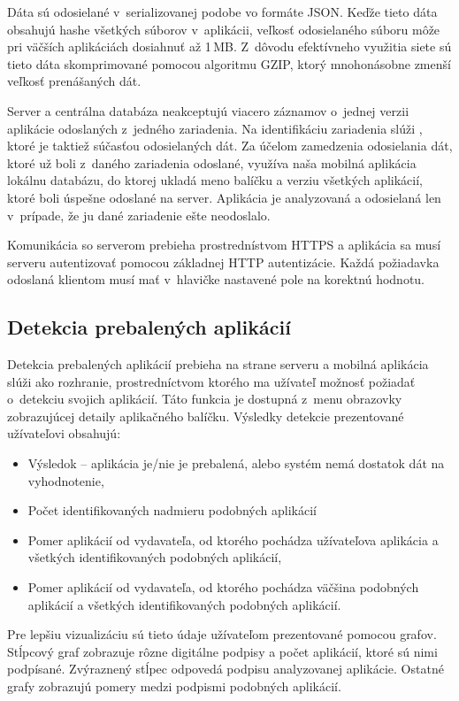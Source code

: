 Dáta sú odosielané v~serializovanej podobe vo formáte JSON. Keďže tieto dáta obsahujú hashe všetkých súborov v~aplikácii, veľkosť odosielaného súboru môže pri väčších aplikáciách dosiahnuť až 1\,MB. Z~dôvodu efektívneho využitia siete sú tieto dáta skomprimované pomocou algoritmu GZIP, ktorý mnohonásobne zmenší veľkosť prenášaných dát.

Server a centrálna databáza neakceptujú viacero záznamov o~jednej verzii aplikácie odoslaných z~jedného zariadenia. Na identifikáciu zariadenia slúži , ktoré je taktiež súčasťou odosielaných dát. Za účelom zamedzenia odosielania dát, ktoré už boli z~daného zariadenia odoslané, využíva naša mobilná aplikácia lokálnu databázu, do ktorej ukladá meno balíčku a verziu všetkých aplikácií, ktoré boli úspešne odoslané na server. Aplikácia je analyzovaná a odosielaná len v~prípade, že ju dané zariadenie ešte neodoslalo.

Komunikácia so serverom prebieha prostrednístvom HTTPS a aplikácia sa musí serveru autentizovať pomocou základnej HTTP autentizácie. Každá požiadavka odoslaná klientom musí mať v~hlavičke nastavené pole  na korektnú hodnotu.

\subsection{Detekcia prebalených aplikácií}
Detekcia prebalených aplikácií prebieha na strane serveru a mobilná aplikácia slúži ako rozhranie, prostredníctvom ktorého ma užívateľ možnosť požiadať o~detekciu svojich aplikácií. Táto funkcia je dostupná z~menu obrazovky zobrazujúcej detaily aplikačného balíčku. Výsledky detekcie prezentované užívateľovi obsahujú:
\begin{itemize}
	\item Výsledok -- aplikácia je/nie je prebalená, alebo systém nemá dostatok dát na vyhodnotenie,
	\item Počet identifikovaných nadmieru podobných aplikácií
	\item Pomer aplikácií od vydavateľa, od ktorého pochádza užívateľova aplikácia a všetkých identifikovaných podobných aplikácií,
	\item Pomer aplikácií od vydavateľa, od ktorého pochádza väčšina podobných aplikácií a všetkých identifikovaných podobných aplikácií.
\end{itemize}

Pre lepšiu vizualizáciu sú tieto údaje užívateľom prezentované pomocou grafov. Stĺpcový graf zobrazuje rôzne digitálne podpisy a počet aplikácií, ktoré sú nimi podpísané. Zvýraznený stĺpec odpovedá podpisu analyzovanej aplikácie. Ostatné grafy zobrazujú pomery medzi podpismi podobných aplikácií.

